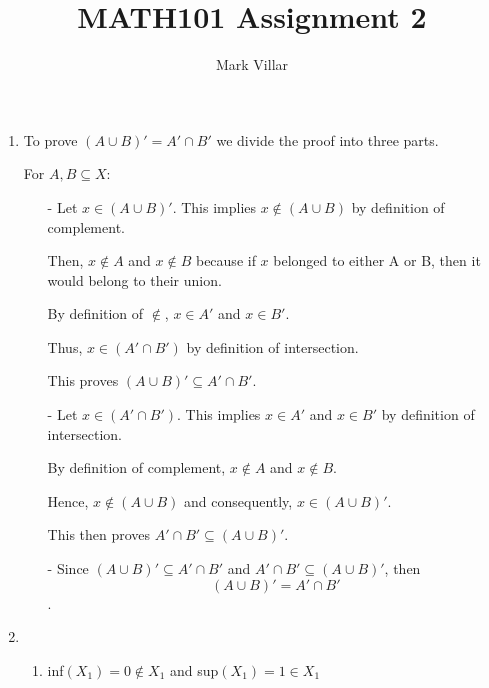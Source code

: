 \documentclass[12pt]{amsart}
\title{MATH101 Assignment 2}
\author{Mark Villar}
\begin{document}
 

\maketitle 

\begin{enumerate}

	\item To prove $(A \cup B)' = A' \cap B'$ we divide the proof into three parts. 
	
	For $A, B \subseteq X$:
	
		\begin{itemize}
		
			\item[-] 
					Let $x \in (A \cup B)'$. This implies $x \notin (A \cup B)$ by definition of 	
					complement. 	
			
					Then, $x \notin A$ and $x \notin B$ because if $x$ belonged 	to either A or B, 						then it would belong to their union.  
						
					By definition of $\notin$, $x \in A'$ and $x \in B'$. 
						
					Thus, $x \in (A' \cap B')$ by definition of intersection. 
						
					This proves  $(A \cup B)' \subseteq A' \cap B'$.
						
			\item[-] 
					Let $x \in (A' \cap B')$.  This implies $x \in A'$ and $x \in B'$ by definition of 							intersection.
			
					By definition of complement, $x \notin A$ and $x \notin B$. 
			
					Hence, $x \notin (A \cup B)$ and consequently, $x \in (A \cup B)'$.  
			
					This then proves $A' \cap B' \subseteq (A \cup B)'$.
			
			\item[-] 
					Since $(A \cup B)' \subseteq A' \cap B'$ and $A' \cap B' \subseteq (A \cup B)'$, then
					$$(A \cup B)' = A' \cap B'$$.
			
		\end{itemize}
		
	\item 
	
		\begin{enumerate}
		
			\item inf$(X_{1}) = 0 \notin X_{1}$ and sup$(X_{1}) = 1 \in X_{1}$
			
				\begin{itemize}
				

\end{itemize}
\end{enumerate}
\end{enumerate}
\end{document}
